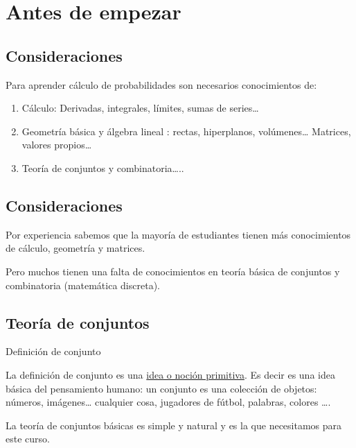 \documentclass[]{book}
\providecommand{\tightlist}{%
  \setlength{\itemsep}{0pt}\setlength{\parskip}{0pt}}
\begin{document}
\hypertarget{antes-de-empezar}{%
\section{Antes de empezar}\label{antes-de-empezar}}

\hypertarget{consideraciones}{%
\subsection{Consideraciones}\label{consideraciones}}

Para aprender cálculo de probabilidades son necesarios conocimientos de:

\begin{enumerate}
\def\labelenumi{\arabic{enumi}.}
\tightlist
\item
  Cálculo: Derivadas, integrales, límites, sumas de series\ldots{}
\item
  Geometría básica y álgebra lineal : rectas, hiperplanos, volúmenes\ldots{} Matrices, valores propios\ldots{}
\item
  Teoría de conjuntos y combinatoria\ldots{}..
\end{enumerate}

\hypertarget{consideraciones-1}{%
\subsection{Consideraciones}\label{consideraciones-1}}

Por experiencia sabemos que la mayoría de estudiantes tienen más conocimientos de cálculo, geometría y matrices.

Pero muchos tienen una falta de conocimientos en teoría básica de conjuntos y combinatoria (matemática discreta).

\hypertarget{teoruxeda-de-conjuntos}{%
\subsection{Teoría de conjuntos}\label{teoruxeda-de-conjuntos}}

 Definición de conjunto

La definición de conjunto es una \href{https://es.wikipedia.org/wiki/Concepto_primitivo}{idea o noción primitiva}. Es decir es una idea básica del pensamiento humano: un conjunto es una colección de objetos: números, imágenes\ldots{} cualquier cosa, jugadores de fútbol, palabras, colores \ldots{}.

La teoría de conjuntos básicas es simple y natural y es la que necesitamos para este curso.
\end{document}
